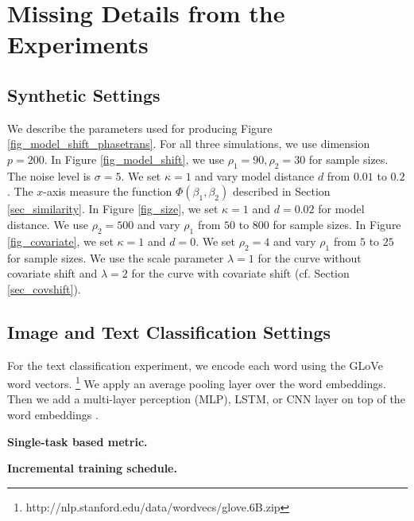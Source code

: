 \section{Missing Details from the Experiments}\label{app_experiments}


\subsection{Synthetic Settings}\label{app_synthetic}
	We describe the parameters used for producing Figure \ref{fig_model_shift_phasetrans}.
	For all three simulations, we use dimension $p = 200$.
	In Figure \ref{fig_model_shift}, we use $\rho_1 = 90, \rho_2 = 30$ for sample sizes.
	The noise level is $\sigma = 5$.
	We set $\kappa = 1$ and vary model distance $d$ from $0.01$ to $0.2$.
	The $x$-axis measure the function $\Phi(\beta_1, \beta_2)$ described in Section \ref{sec_similarity}.
	In Figure \ref{fig_size}, we set $\kappa = 1$ and $d = 0.02$ for model distance.
	We use $\rho_2 = 500$ and vary $\rho_1$ from $50$ to $800$ for sample sizes.
	In Figure \ref{fig_covariate}, we set $\kappa = 1$ and $d = 0$.
	We set $\rho_2 = 4$ and vary $\rho_1$ from $5$ to $25$ for sample sizes.
	We use the scale parameter $\lambda = 1$ for the curve without covariate shift and $\lambda = 2$ for the curve with covariate shift (cf. Section \ref{sec_covshift}).

\subsection{Image and Text Classification Settings}\label{app_it}

For the text classification experiment, we encode each word using the GLoVe word vectors.
\footnote{http://nlp.stanford.edu/data/wordvecs/glove.6B.zip}
We apply an average pooling layer over the word embeddings.
Then we add a multi-layer perception (MLP), LSTM, or CNN layer on top of the word embeddings \cite{lei2018simple}.

\textbf{Single-task based metric.}

\textbf{Incremental training schedule.}

